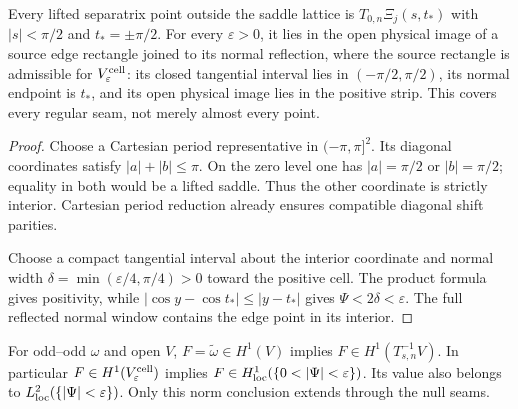 \begin{lemma}
\label{lem:periodic-regular-edge-cover}
\leanok
Every lifted separatrix point outside the saddle lattice is
$T_{0,n}\Xi_j(s,t_*)$ with $|s|<\pi/2$ and $t_*=\pm\pi/2$.
For every $\varepsilon>0$, it lies in the open physical image of a
source edge rectangle joined to its normal reflection, where the source
rectangle is admissible for $V_\varepsilon^{\rm cell}$:
its closed tangential interval lies in $(-\pi/2,\pi/2)$, its normal
endpoint is $t_*$, and its open physical image lies in the positive strip.
This covers every regular seam, not merely almost every point.
\end{lemma}

\begin{proof}
\leanok
Choose a Cartesian period representative in $(-\pi,\pi]^2$.
Its diagonal coordinates satisfy $|a|+|b|\le\pi$.
On the zero level one has $|a|=\pi/2$ or $|b|=\pi/2$; equality in both
would be a lifted saddle. Thus the other coordinate is strictly interior.
Cartesian period reduction already ensures compatible diagonal shift parities.

Choose a compact tangential interval about the interior coordinate and
normal width $\delta=\min(\varepsilon/4,\pi/4)>0$ toward the positive cell.
The product formula gives positivity, while
$|\cos y-\cos t_*|\le|y-t_*|$ gives $\Psi<2\delta<\varepsilon$.
The full reflected normal window contains the edge point in its interior.
\end{proof}

\begin{lemma}
\label{lem:odd-odd-h1-cell-fold}
\leanok
For odd--odd $\omega$ and open $V$, $F=\widetilde\omega\in H^1(V)$
implies $F\in H^1(T_{s,n}^{-1}V)$.
In particular $F\in H^1(V_\varepsilon^{\rm cell})$ implies
$F\in H^1_{\rm loc}(\{0<|\Psi|<\varepsilon\})$.
Its value also belongs to $L^2_{\rm loc}(\{|\Psi|<\varepsilon\})$.
Only this norm conclusion extends through the null seams.
\end{lemma}

